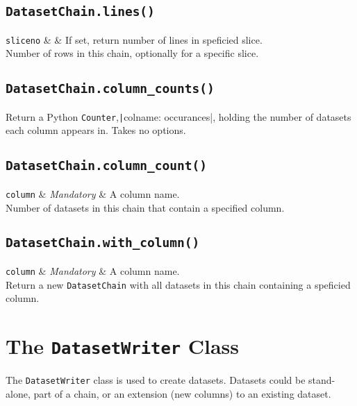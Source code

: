 \subsection{\texttt{DatasetChain.lines()}}
\starttable
\texttt{sliceno} & \pyNone & If set, return number of lines in speficied slice.\\
\stoptable
Number of rows in this chain, optionally for a specific slice.


\subsection{\texttt{DatasetChain.column\_counts()}}
Return a Python \texttt{Counter},\texttt|{colname:
occurances}|, holding the number of datasets each column appears in.
Takes no options.


\subsection{\texttt{DatasetChain.column\_count()}}
\starttable
\texttt{column} & \textsl{Mandatory} & A column name.\\
\stoptable
Number of datasets in this chain that contain a specified column.


\subsection{\texttt{DatasetChain.with\_column()}}
\starttable
\texttt{column} & \textsl{Mandatory} & A column name.\\
\stoptable
Return a new \texttt{DatasetChain} with all datasets in this chain
containing a speficied column.



\clearpage
\section{The \texttt{DatasetWriter} Class}
\label{sec:classes:datasetwriter}
The \texttt{DatasetWriter} class is used to create datasets.  Datasets
could be stand-alone, part of a chain, or an extension (new columns)
to an existing dataset.

